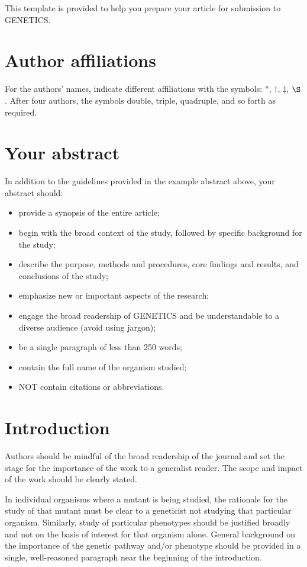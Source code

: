 \documentclass[10pt,twocolumn,twoside,lineno]{gsajnl}
\begin{document}
This template is provided to help you prepare your article for submission to GENETICS.

\section{Author affiliations}

For the authors' names, indicate different affiliations with the symbols: $\ast$, $\dagger$, $\ddagger$, $\S$. After four authors, the symbols double, triple, quadruple, and so forth as required.

\section{Your abstract}

In addition to the guidelines provided in the example abstract above, your abstract should:

\begin{itemize}
\item provide a synopsis of the entire article;
\item begin with the broad context of the study, followed by specific background for the study;
\item describe the purpose, methods and procedures, core findings and results, and conclusions of the study;
\item emphasize new or important aspects of the research;
\item engage the broad readership of GENETICS and be understandable to a diverse audience (avoid using jargon);
\item be a single paragraph of less than 250 words;
\item contain the full name of the organism studied;
\item NOT contain citations or abbreviations.
\end{itemize}

\section{Introduction}

Authors should be mindful of the broad readership of the journal and set the stage for the importance of the work to a generalist reader. The scope and impact of the work should be clearly stated.

In individual organisms where a mutant is being studied, the rationale for the study of that mutant must be clear to a geneticist not studying that particular organism. Similarly, study of particular phenotypes should be justified broadly and not on the basis of interest for that organism alone. General background on the importance of the genetic pathway and/or phenotype should be provided in a single, well-reasoned paragraph near the beginning of the introduction.
\end{document}

